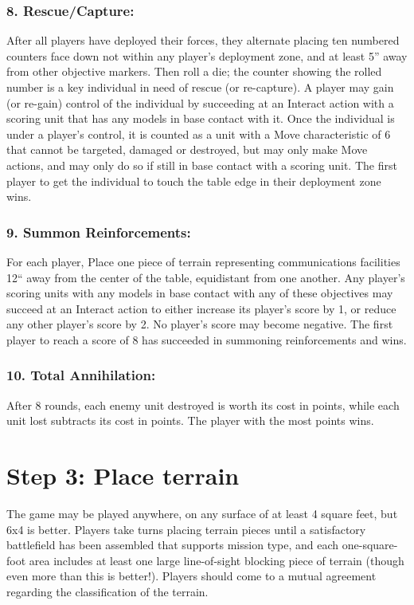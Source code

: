 \begin{multicols}{2}
\subsubsection*{8. Rescue/Capture:} After all players have deployed their forces, they alternate placing ten numbered counters face down not within any player's deployment zone, and at least 5'' away from other objective markers. Then roll a die; the counter showing the rolled number is a key individual in need of rescue (or re-capture). A player may gain (or re-gain) control of the individual by succeeding at an Interact action with a scoring unit that has any models in base contact with it. Once the individual is under a player's control, it is counted as a unit with a Move characteristic of 6 that cannot be targeted, damaged or destroyed, but may only make Move actions, and may only do so if still in base contact with a scoring unit. The first player to get the individual to touch the table edge in their deployment zone wins.

\subsubsection*{9. Summon Reinforcements:} For each player, Place one piece of terrain representing communications facilities 12`` away from the center of the table, equidistant from one another. Any player's scoring units with any models in base contact with any of these objectives may succeed at an Interact action to either increase its player's score by 1, or reduce any other player's score by 2. No player's score may become negative. The first player to reach a score of 8 has succeeded in summoning reinforcements and wins.

\subsubsection*{10. Total Annihilation:} After 8 rounds, each enemy unit destroyed is worth its cost in points, while each unit lost subtracts its cost in points. The player with the most points wins.




\section*{Step 3: Place terrain}
The game may be played anywhere, on any surface of at least 4 square feet, but 6x4 is better. Players take turns placing terrain pieces until a satisfactory battlefield has been assembled that supports mission type, and each one-square-foot area includes at least one large line-of-sight blocking piece of terrain (though even more than this is better!). Players should come to a mutual agreement regarding the classification of the terrain.





\end{multicols}
